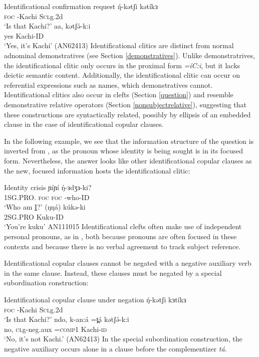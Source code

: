 \ea  Identificational confirmation request \label{ex:copular:id2}
	 	\gll  ŋ́-kətʃi kətíkɜ\\
					 \textsc{foc} -Kachi	   S\textsc{cl}g.2d	\\
				\glt   ‘Is that Kachi?’ 
		\gll aa, 	kətʃə́-k:i	\\
					 yes	Kachi-ID	\\
				\glt ‘Yes, it’s Kachi’	\hfill	 (AN62413)
\z  
Identificational clitics are distinct from normal adnominal demonstratives (see Section \ref{demonstratives}). Unlike demonstratrives, the identificational clitic only occurs in the proximal form \textit{=íC:i}, but it lacks deictic semantic content. Additionally, the identificational clitic can occur on referential expressions such as names, which demonstratives cannot. Identificational clitics also occur in clefts (Section \ref{question}) and resemble demonstrative relative operators (Section \ref{nonsubjectrelative}), suggesting that these constructions are syntactically related, possibly by ellipsis of an embedded clause in the case of identificational copular clauses. 

In the following example, we see that the information structure of the question is inverted from , as the pronoun whose identity is being sought is in its focused form. Nevertheless, the answer looks like other identificational copular clauses as the new, focused information hosts the identificational clitic:

\ea  Identity crisis\label{ex:copular:id3}
	 	\gll 	ɲíɲí ŋ́-ɜdʒɜ-ki? \\
						1SG.PRO. \textsc{foc} 	   \textsc{foc} -who-ID \\
				\glt  	‘Who am \underline{I}?’ 
		\gll 	(ŋŋá) kúkə-ki	\\
						2SG.PRO	Kuku-ID\\
				\glt 	‘You're kuku’ \hfill AN111015 \label{ex:copular:id3b}
\z 
Identificational clefts often make use of independent personal pronouns, as in , both because pronouns are often focused in these contexts and because there is no verbal agreement to track subject reference.

Identificational copular clauses cannot be negated with a negative auxiliary verb in the same clause. Instead, these clauses must be negated by a special subordination construction:

\ea  Identificational copular clause under negation
	 	\gll 	 	ŋ́-kətʃi kɜtíkɜ		\\
					 \textsc{foc} -Kachi	   S\textsc{cl}g.2d	\\
				\glt  		‘Is that Kachi?’ 
			\gll 		ndo, 		k-an:á  	=t̪á		kətʃə́-k:i\\
			no,		\textsc{cl}g-neg.aux	 =\textsc{comp1}	Kachi-\textsc{id}\\
				\glt 	‘No, it’s not Kachi.’		\hfill	 (AN62413)
\z  
In the special subordination construction, the negative auxiliary occurs alone in a clause before the complementizer \textit{tá}.

